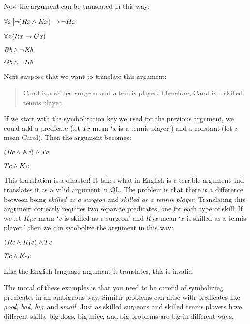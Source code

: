 Now the argument can be translated in this way:
\begin{earg}
\label{surgeon2}
\item[] $\forall x\bigl[\neg (Rx \wedge Kx) \rightarrow \neg Hx\bigr]$
\item[] $\forall x(Rx \rightarrow Gx)$
\item[] $Rb \wedge \neg Kb$
\item[\therefore] $Gb \wedge \neg Hb$
\end{earg}

Next suppose that we want to translate this argument:
\begin{quote}
\label{surgeon3}
Carol is a skilled surgeon and a tennis player. Therefore, Carol is a skilled tennis player.
\end{quote}
If we start with the symbolization key we used for the previous argument, we could add a predicate (let $Tx$ mean `$x$ is a tennis player') and a constant (let $c$ mean Carol). Then the argument becomes:
\begin{earg}
\item[] $(Rc \wedge Kc) \wedge Tc$
\item[\therefore] $Tc \wedge Kc$
\end{earg}
This translation is a disaster! It takes what in English is a terrible argument and translates it as a valid argument in QL. The problem is that there is a difference between being \emph{skilled as a surgeon} and \emph{skilled as a tennis player}. Translating this argument correctly requires two separate predicates, one for each type of skill. If we let $K_1x$ mean `$x$ is skilled as a surgeon' and $K_2x$ mean `$x$ is skilled as a tennis player,' then we can symbolize the argument in this way:
\begin{earg}
\label{surgeon3correct}
\item[] $(Rc \wedge K_1c) \wedge Tc$
\item[\therefore] $Tc \wedge K_2c$
\end{earg}
Like the English language argument it translates, this is invalid. %

The moral of these examples is that you need to be careful of symbolizing predicates in an ambiguous way. Similar problems can arise with predicates like \emph{good}, \emph{bad}, \emph{big}, and \emph{small}. Just as skilled surgeons and skilled tennis players have different skills, big dogs, big mice, and big problems are big in different ways.

